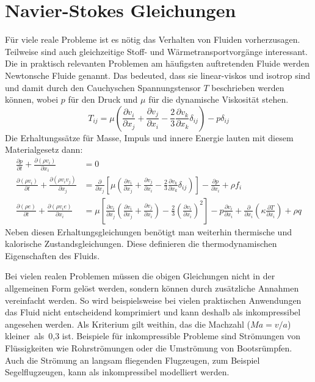 \section{Navier-Stokes Gleichungen}

Für viele reale Probleme ist es nötig das Verhalten von Fluiden vorherzusagen.
Teilweise sind auch gleichzeitige Stoff- und Wärmetransportvorgänge interessant.
Die in praktisch relevanten Problemen am häufigsten auftretenden Fluide werden Newtonsche Fluide genannt.
Das bedeuted, dass sie linear-viskos und isotrop sind und damit durch den Cauchyschen
Spannungstensor $T$ beschrieben werden können, wobei $p$ für den Druck und $\mu$ für die dynamische Viskosität stehen.
\begin{equation}
  T_{ij} = \mu\left({\frac{\partial v_i}{\partial x_j}
  + \frac{\partial v_j}{\partial x_i}
-\frac{2}{3} \frac{\partial v_k}{\partial x_k} \delta_{ij}}\right)
-p\delta_{ij}
\end{equation}
Die
Erhaltungssätze für Masse, Impuls und innere Energie lauten mit diesem Materialgesetz dann:
\begin{align}
  \frac{\partial p}{\partial t} + \frac{\partial (\rho v_i)}{\partial x_i} &= 0\\
  \frac{\partial (\rho v_i)}{\partial t} + \frac{\partial (\rho v_i v_j)}{\partial x_j} &=
  \frac{\partial}{\partial x_j} \left[{\mu
  \left({\frac{\partial v_i}{\partial x_j}
  +\frac{\partial v_j}{\partial x_i}
  - \frac{2}{3} \frac{\partial v_k}{\partial x_k}\delta_{ij}}\right)}\right]
  -\frac{\partial p}{\partial x_i} + \rho f_i\\
  \frac{\partial (\rho e)}{\partial t} + \frac{\partial (\rho v_i e)}{\partial x_i} &=
  \mu \left[{\frac{\partial v_i}{\partial x_j}
  \left({\frac{\partial v_i}{\partial x_j}
  +\frac{\partial v_j}{\partial x_i}}\right)
  - \frac{2}{3} \left({\frac{\partial v_i}{\partial x_i}}\right)^2}\right]
  -p\frac{\partial v_i}{\partial x_i} +\frac{\partial}{\partial x_i}
  \left({\kappa \frac{\partial T}{\partial x_i}}\right)
  + \rho q
\end{align}
Neben diesen Erhaltungsgleichungen benötigt man weiterhin thermische und kalorische Zustands\-gleich\-ungen.
Diese definieren die thermodynamischen Eigenschaften des Fluids.

Bei
vielen realen Problemen müssen die obigen Gleichungen nicht in der allgemeinen Form gelöst werden, sondern
können durch zusätzliche Annahmen vereinfacht werden.
So wird beispielsweise bei vielen praktischen Anwendungen das Fluid nicht entscheidend komprimiert
und kann deshalb als inkompressibel angesehen werden. Als Kriterium gilt weithin,
das die Machzahl ($Ma = v/a$) kleiner~als~0,3 ist. Beispiele für inkompressible Probleme
sind Strömungen von Flüssigkeiten wie Rohrströmungen oder die Umströmung von Bootsrümpfen.
Auch die Strömung an langsam fliegenden Flugzeugen, zum Beispiel Segelflugzeugen, kann als
inkompressibel modelliert werden.

